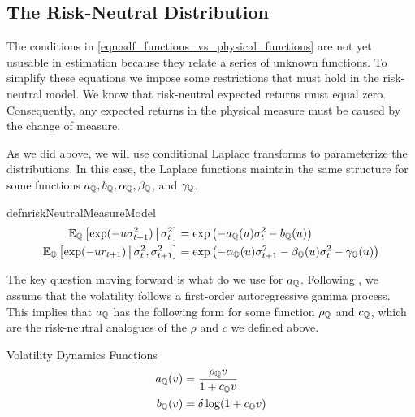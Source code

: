 \documentclass[11pt, letterpaper, twoside, final]{article}
\begin{document}
\subsection{The Risk-Neutral Distribution}

The conditions in \cref{eqn:sdf_functions_vs_physical_functions} are not yet ususable in estimation because they
relate a series of unknown functions.
To simplify these equations we impose some restrictions that must hold in the risk-neutral model. 
We know that risk-neutral expected returns must equal zero.
Consequently, any expected returns in the physical measure must be caused by the change of measure.

As we did above, we will use conditional Laplace transforms to parameterize the distributions.
In this case, the Laplace functions maintain the same structure for some functions $a_{\mathbb{Q}}, b_{\mathbb{Q}},
\alpha_{\mathbb{Q}}, \beta_{\mathbb{Q}}$, and $\gamma_{\mathbb{Q}}$.

\begin{restatable}{defn}{riskNeutralMeasureModel}
    \label{defn:risk_neutral_model}
    \begin{align}
        \operatorname{\mathbb{E}}_{\mathbb{Q}} \left[\exp(-u \sigma^2_{t+1}) \,\middle\vert\, \sigma^2_t \right] &= \exp\left( - a_{\mathbb{Q}}(u) \sigma^2_t -
        b_{\mathbb{Q}}(u) \right) \\
        \operatorname{\mathbb{E}}_{\mathbb{Q}}\left[\exp(-u r_{t+1}) \,\middle\vert\, \sigma^2_t,  \sigma^2_{t+1}\right] &= \exp\left(- \alpha_{\mathbb{Q}}(u)
        \sigma^2_{t+1} - \beta_{\mathbb{Q}}(u)\sigma^2_t - \gamma_{\mathbb{Q}}(u) \right) 
    \end{align}
\end{restatable}

The key question moving forward is what do we use for $a_{\mathbb{Q}}$. 
Following \textcite{khrapov2016affine}, we assume that the volatility follows a first-order autoregressive gamma
process.
This implies that $a_{\mathbb{Q}}$ has the following form for some function $\rho_{\mathbb{Q}}$ and $c_{\mathbb{Q}}$, which are the
risk-neutral analogues of the $\rho$ and $c$ we defined above.

\begin{defn}{Volatility Dynamics Functions}
    \begin{align}
        \label{defn:a_QQ}
        a_{\mathbb{Q}}(v) &= \frac{\rho_{\mathbb{Q}} v}{1 + c_{\mathbb{Q}} v} \\
        \label{defn:b_QQ}
        b_{\mathbb{Q}}(v) &= \delta \log(1 + c_{\mathbb{Q}} v)
    \end{align}
\end{defn}
\end{document}
